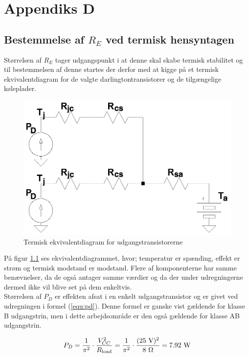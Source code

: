 \chapter{Appendiks D}
\section*{Bestemmelse af $R_E$ ved termisk hensyntagen}
Størrelsen af $R_E$ tager udgangspunkt i at denne skal skabe termisk stabilitet og til bestemmelsen af denne startes der derfor med at kigge på et termisk ekvivalentdiagram for de valgte darlingtontransistorer og de tilgængelige køleplader. 

\begin{figure}[h]
\centering
\includegraphics[scale=0.2]{teknisk/effektforstaerker/termisk_ekvivalentdiagram.png}
\caption{Termisk ekvivalentdiagram for udgangstransistorerne}
\label{fig:term-dia}
\end{figure}

På figur \ref{fig:term-dia} ses ekvivalentdiagrammet, hvor; temperatur er spænding, effekt er strøm og termisk modstand er modstand. Flere af komponenterne har samme benævnelser, da de også antager samme værdier og da der under udregningerne dermed ikke vil blive set på dem enkeltvis.\\
Størrelsen af $P_D$ er effekten afsat i en enkelt udgangstransistor og er givet ved udregningen i formel (\ref{equ:pd}). Denne formel er ganske vist gældende for klasse B udgangstrin, men i dette arbejdsområde er den også gældende for klasse AB udgangstrin.

\begin{equation}
\label{equ:pd}
P_D = \frac{1}{\pi^2} \cdot \frac{V_{CC}^2}{R_{\mathrm{load}}} = \frac{1}{\pi^2} \cdot \frac{(25~\mathrm{V})^2}{8~\ohm} = 7.92~\mathrm{W}
\end{equation}

